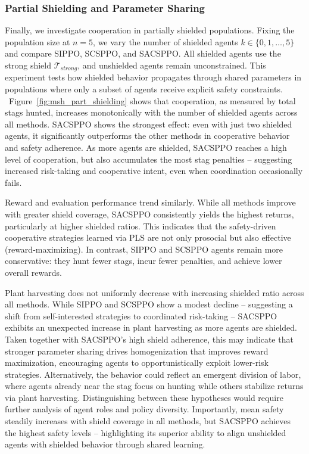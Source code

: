 \documentclass{ecai}
\theoremstyle{plain}
\theoremstyle{definition}
\theoremstyle{remark}
\begin{document}
\subsubsection{Partial Shielding and Parameter Sharing} \label{exp:partial_shield}


Finally, we investigate cooperation in partially shielded populations. Fixing the population size at $n=5$, we vary the number of shielded agents $k \in \{0, 1, \dots, 5\}$ and compare SIPPO, SCSPPO, and SACSPPO. All shielded agents use the strong shield $\mathcal{T}_{strong}$, and unshielded agents remain unconstrained. This experiment tests how shielded behavior propagates through shared parameters in populations where only a subset of agents receive explicit safety constraints.
\newline\indent~Figure~\ref{fig:msh_part_shielding} shows that cooperation, as measured by total stags hunted, increases monotonically with the number of shielded agents across all methods. SACSPPO shows the strongest effect: even with just two shielded agents, it significantly outperforms the other methods in cooperative behavior and safety adherence. As more agents are shielded, SACSPPO reaches a high level of cooperation, but also accumulates the most stag penalties -- suggesting increased risk-taking and cooperative intent, even when coordination occasionally fails.

Reward and evaluation performance trend similarly. While all methods improve with greater shield coverage, SACSPPO consistently yields the highest returns, particularly at higher shielded ratios. This indicates that the safety-driven cooperative strategies learned via PLS are not only prosocial but also effective (reward-maximizing). In contrast, SIPPO and SCSPPO agents remain more conservative: they hunt fewer stags, incur fewer penalties, and achieve lower overall rewards.

Plant harvesting does not uniformly decrease with increasing shielded ratio across all methods. While SIPPO and SCSPPO show a modest decline -- suggesting a shift from self-interested strategies to coordinated risk-taking -- SACSPPO exhibits an unexpected increase in plant harvesting as more agents are shielded. Taken together with SACSPPO’s high shield adherence, this may indicate that stronger parameter sharing drives homogenization that improves reward maximization, encouraging agents to opportunistically exploit lower-risk strategies. Alternatively, the behavior could reflect an emergent division of labor, where agents already near the stag focus on hunting while others stabilize returns via plant harvesting. Distinguishing between these hypotheses would require further analysis of agent roles and policy diversity. Importantly, mean safety steadily increases with shield coverage in all methods, but SACSPPO achieves the highest safety levels -- highlighting its superior ability to align unshielded agents with shielded behavior through shared learning.
\end{document}
